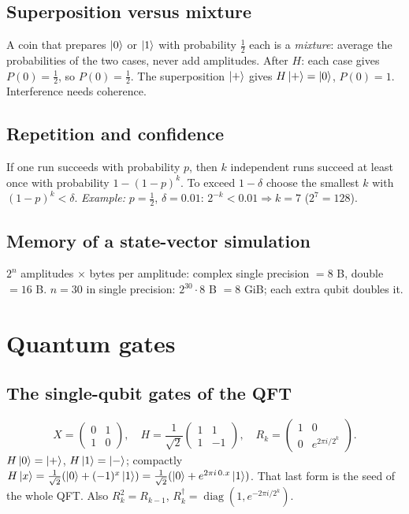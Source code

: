 \documentclass[11pt,a4paper,openany]{book}
\begin{document}
\subsection{Superposition versus mixture}
A coin that prepares $\ket0$ or $\ket1$ with probability $\frac12$ each is a \emph{mixture}: average the probabilities of the
two cases, never add amplitudes. After $H$: each case gives $P(0) = \frac12$, so $P(0) = \frac12$. The superposition
$\ket+$ gives $H\ket+ = \ket0$, $P(0) = 1$. Interference needs coherence.

\subsection{Repetition and confidence}
If one run succeeds with probability $p$, then $k$ independent runs succeed at least once with probability $1 - (1-p)^k$.
To exceed $1 - \delta$ choose the smallest $k$ with $(1-p)^k < \delta$. \emph{Example:} $p = \frac12$, $\delta = 0.01$: $2^{-k} < 0.01 \Rightarrow k = 7$
($2^7 = 128$).

\subsection{Memory of a state-vector simulation}
$2^n$ amplitudes $\times$ bytes per amplitude: complex single precision $= 8$ B, double $= 16$ B. $n = 30$ in single
precision: $2^{30}\cdot 8$ B $= 8$ GiB; each extra qubit doubles it.

\section{Quantum gates}
\subsection{The single-qubit gates of the QFT}
\[ X = \begin{pmatrix}0&1\\1&0\end{pmatrix},\quad H = \frac{1}{\sqrt2}\begin{pmatrix}1&1\\1&-1\end{pmatrix},\quad
   R_k = \begin{pmatrix}1&0\\0&e^{2\pi i/2^k}\end{pmatrix}. \]
$H\ket0 = \ket+$, $H\ket1 = \ket-$; compactly $H\ket{x} = \frac{1}{\sqrt2}(\ket0 + (-1)^x\ket1) = \frac{1}{\sqrt2}(\ket0 + e^{2\pi i\,0.x}\ket1)$.
That last form is the seed of the whole QFT. Also $R_k^2 = R_{k-1}$, $R_k^\dagger = \operatorname{diag}(1, e^{-2\pi i/2^k})$.
\end{document}
